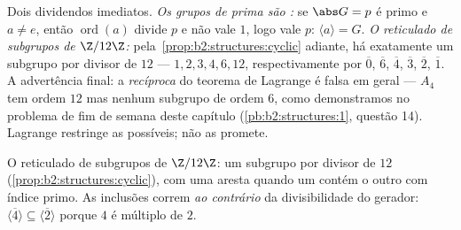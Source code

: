 \begin{example}\label{ex:b2:structures:lagrangeapp}
Dois dividendos imediatos. \emph{Os grupos de  prima são :}
se $\abs G = p$ é primo e $a \neq e$, então
$\operatorname{ord}(a)$ divide $p$ e não vale $1$, logo vale $p$:
$\langle a\rangle = G$. \emph{O reticulado de subgrupos de $\Z/12\Z$:}
pela~\cref{prop:b2:structures:cyclic} adiante, há exatamente um
subgrupo por divisor de $12$ ---  $1, 2, 3, 4, 6, 12$,
 respectivamente por $\overline 0$, $\overline 6$, $\overline
4$, $\overline 3$, $\overline 2$, $\overline 1$. A advertência
final: a \emph{recíproca} do teorema de Lagrange é falsa em geral --- $A_4$
tem ordem $12$ mas nenhum subgrupo de ordem $6$, como demonstramos no
problema de fim de semana deste capítulo (\cref{pb:b2:structures:1}, questão 14).
Lagrange restringe as  possíveis; não as promete.
\end{example}

\begin{omfigure}

{\small O reticulado de subgrupos de $\Z/12\Z$: um subgrupo por
divisor de $12$ (\cref{prop:b2:structures:cyclic}), com uma aresta
quando um contém o outro com índice primo. As inclusões correm
\emph{ao contrário} da divisibilidade do gerador: $\langle\overline
4\rangle \subseteq \langle\overline2\rangle$ porque $4$ é
múltiplo de $2$.}
\end{omfigure}

